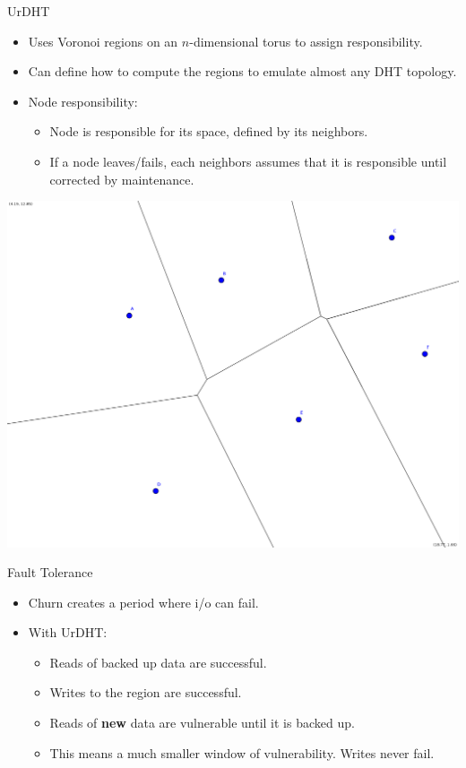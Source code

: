 \documentclass[11pt]{beamer}
\begin{document}
\begin{frame}{UrDHT}
	\begin{itemize}
		\item Uses Voronoi regions on an $n$-dimensional torus to assign responsibility.
		\item Can define how to compute the regions to emulate almost any DHT topology.
		\item Node responsibility:
		\begin{itemize}
			\item Node is responsible for its space, defined by its neighbors.
			\item If a node leaves/fails, each neighbors assumes that it is responsible until corrected by maintenance. 
		\end{itemize}
	\end{itemize}
	
\begin{center}
\includegraphics[width=0.5\linewidth]{figs/new_voronoi}
\end{center}


\end{frame}

\begin{frame}{Fault Tolerance}
	\begin{itemize}
		\item Churn creates a period where i/o can fail.  
		\item With UrDHT:
		\begin{itemize}
			\item Reads of backed up data are successful.
			\item Writes to the region are successful. 
			\item Reads of \textbf{new} data are vulnerable until it is backed up.
			\item This means a much smaller window of vulnerability.  Writes never fail.%
		\end{itemize}
	\end{itemize}

\end{frame}
\end{document}
